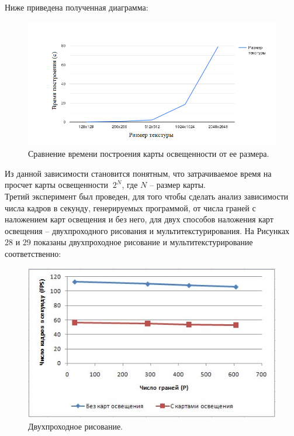 \documentclass[a4paper, 10pt]{article}
\begin{document}
	Ниже приведена полученная диаграмма:
	\clearpage
	\newpage 
	\begin{figure}[h]
		\centering \includegraphics[scale=2]{chart2}
		\centering\caption{Сравнение времени построения карты освещенности от ее размера.}
	\end{figure}
	 Из данной зависимости становится понятным, что затрачиваемое время на просчет карты освещенности  $~2^N$, где $N$ – размер карты.
	\\ \hspace*{5mm} Третий эксперимент был проведен, для того чтобы сделать анализ зависимости числа кадров в секунду, генерируемых программой, от числа граней с наложением карт освещения и без него, для двух способов наложения карт освещения – двухпроходного рисования и мультитекстурирования. На Рисунках 28 и 29 показаны двухпроходное рисование и мультитекстурирование соответственно:
	\begin{figure}[h]
		\centering \includegraphics[scale=1]{chart3}
		\centering\caption{Двухпроходное рисование.}
	\end{figure}
	\clearpage
	\newpage
\end{document}
